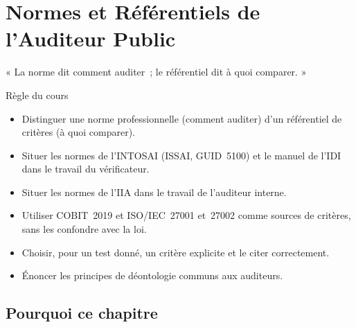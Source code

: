 
\chapter{Normes et Référentiels de l'Auditeur Public}
\label{chap:normes}

\epigraph{%
    « La norme dit comment auditer~; le référentiel dit à quoi comparer. »%
}{Règle du cours}


\begin{boxobjectifs}
\begin{itemize}
    \item Distinguer une norme professionnelle (comment auditer) d'un
          référentiel de critères (à quoi comparer).
    \item Situer les normes de l'INTOSAI (ISSAI, GUID~5100) et le manuel de
          l'IDI dans le travail du vérificateur.
    \item Situer les normes de l'IIA dans le travail de l'auditeur interne.
    \item Utiliser COBIT~2019 et ISO/IEC~27001 et~27002 comme sources de
          critères, sans les confondre avec la loi.
    \item Choisir, pour un test donné, un critère explicite et le citer
          correctement.
    \item Énoncer les principes de déontologie communs aux auditeurs.
\end{itemize}
\end{boxobjectifs}

\bigskip

\section*{Pourquoi ce chapitre}

